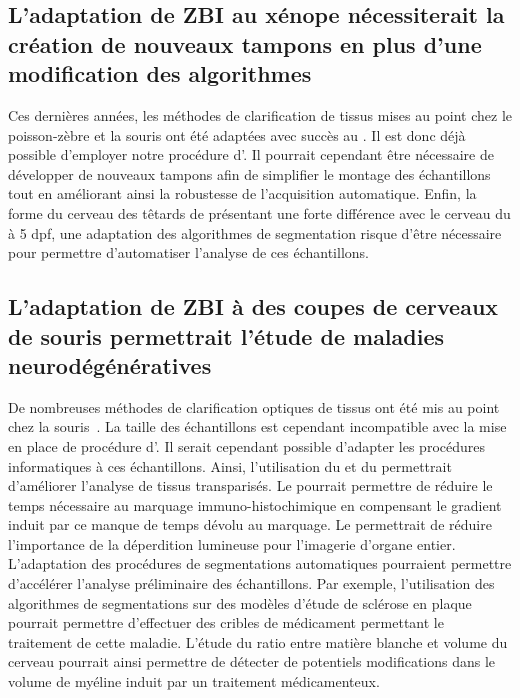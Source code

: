 \documentclass[\main/main.tex]{subfiles}
\begin{document}
    \subsection{L'adaptation de ZBI au xénope nécessiterait la création de nouveaux tampons en plus d'une modification des algorithmes}
%
Ces dernières années, les méthodes de clarification de tissus mises au point chez le poisson-zèbre et la souris ont été adaptées avec succès au \xl{}\cite{fini_2017,affaticati_2018}.
%
Il est donc déjà possible d'employer notre procédure d'\hti.
%
Il pourrait cependant être nécessaire de développer de nouveaux tampons afin de simplifier le montage des échantillons
tout en améliorant ainsi la robustesse de l'acquisition automatique.
%
Enfin, la forme du cerveau des têtards de \xl présentant une forte différence avec le cerveau du \pz à 5 dpf,
une adaptation des algorithmes de segmentation risque d'être nécessaire pour permettre d'automatiser l'analyse de ces échantillons.

    \subsection{L'adaptation de ZBI à des coupes de cerveaux de souris permettrait l'étude de maladies neurodégénératives}
    
De nombreuses méthodes de clarification optiques de tissus ont été mis au point chez la souris~\cite{tainaka_2018,tomer_2015}.
%
La taille des échantillons est cependant incompatible avec la mise en place de procédure d'\hti{}.
%
Il serait cependant possible d'adapter les procédures informatiques à ces échantillons.
%
Ainsi, l'utilisation du \sbddcc{} et du \sblc{} permettrait d'améliorer l'analyse de tissus transparisés.
%
Le \sblc{} pourrait permettre de réduire le temps nécessaire au marquage immuno-histochimique en compensant le gradient induit par ce manque de temps dévolu au marquage.
%
Le \sbddcc{} permettrait de réduire l'importance de la déperdition lumineuse pour l'imagerie d'organe entier.
%
L'adaptation des procédures de segmentations automatiques pourraient permettre d'accélérer l'analyse préliminaire des échantillons.
%
Par exemple, l'utilisation des algorithmes de segmentations sur des modèles d'étude de sclérose en plaque pourrait permettre d'effectuer des cribles de médicament permettant le traitement de cette maladie.
%
L'étude du ratio entre matière blanche et volume du cerveau pourrait ainsi permettre de détecter de potentiels modifications dans le volume de myéline induit par un traitement médicamenteux.
\end{document}
